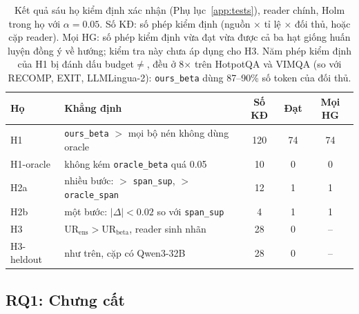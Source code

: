 \documentclass[11pt]{article}
\newcommand{\arm}[1]{\texttt{#1}}
\begin{document}
\begin{table}[t]
\centering
\footnotesize
\setlength{\tabcolsep}{3pt}
\begin{tabular}{L{1.35cm}L{2.8cm}ccc}
\toprule
\textbf{Họ} & \textbf{Khẳng định} & \textbf{Số KĐ} & \textbf{Đạt} & \textbf{Mọi HG} \\
\midrule
H1 & \arm{ours\_beta} $>$ mọi bộ nén không dùng oracle & 120 & 74 & 74 \\
H1-oracle & không kém \arm{oracle\_beta} quá 0.05 & 10 & 0 & 0 \\
\midrule
H2a & nhiều bước: $>$ \arm{span\_sup}, $>$ \arm{oracle\_span} & 12 & 1 & 1 \\
H2b & một bước: $|\Delta|<0.02$ so với \arm{span\_sup} & 4 & 1 & 1 \\
\midrule
H3 & $\mathrm{UR}_{\text{ens}}>\mathrm{UR}_{\text{beta}}$, reader sinh nhãn & 28 & 0 & -- \\
H3-heldout & như trên, cặp có Qwen3-32B & 28 & 0 & -- \\
\bottomrule
\end{tabular}
\caption{Kết quả sáu họ kiểm định xác nhận (Phụ lục~\ref{app:tests}), reader chính, Holm trong họ với
$\alpha=0.05$. Số KĐ: số phép kiểm định (nguồn $\times$ tỉ lệ $\times$ đối thủ, hoặc cặp reader). Mọi HG:
số phép kiểm định vừa đạt vừa được cả ba hạt giống huấn luyện đồng ý về hướng; kiểm tra này chưa áp dụng
cho H3. Năm phép kiểm định của H1 bị đánh dấu budget${\neq}$, đều ở 8$\times$ trên HotpotQA và VIMQA (so với
RECOMP, EXIT, LLMLingua-2): \arm{ours\_beta} dùng 87--90\% số token của đối thủ.}
\label{tab:hypres}
\end{table}

\subsection{RQ1: Chưng cất}
\end{document}
